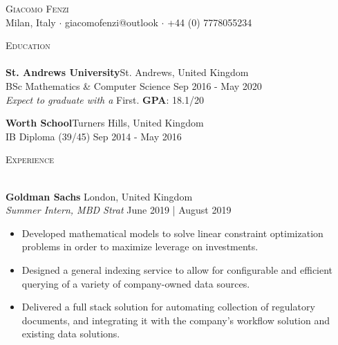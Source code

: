 \documentclass[a4paper]{article}
\newcommand{\lineunder} {
    \vspace*{-8pt} \\
    \hspace*{-18pt} \hrulefill \\
}
\newcommand{\header} [1] {
    {\hspace*{-18pt}\vspace*{6pt} \textsc{#1}}
    \vspace*{-6pt} \lineunder
}
\begin{document}
\vspace*{-40pt}

    

\vspace*{-10pt}
\begin{center}
	{\Huge \scshape {Giacomo Fenzi}}\\
	Milan, Italy $\cdot$ giacomofenzi@outlook $\cdot$ +44 (0) 7778055234\\
\end{center}

\header{Education}
\textbf{St. Andrews University}\hfill St. Andrews, United Kingdom\\
BSc Mathematics \& Computer Science \hfill Sep 2016 - May 2020\\
\textit{Expect to graduate with a} First. \textbf{GPA}: 18.1/20 \\
\vspace{2mm}

\textbf{Worth School}\hfill Turners Hills, United Kingdom\\
IB Diploma (39/45) \hfill Sep 2014 - May 2016 \\

\vspace{2mm}

\header{Experience}
\vspace{1mm}

\textbf{Goldman Sachs} \hfill London, United Kingdom \\
\textit{Summer Intern, MBD Strat} \hfill{June 2019 | August 2019}
\vspace{-1mm}
\begin{itemize} \itemsep 1pt
    \item Developed mathematical models to solve linear constraint optimization problems in order to maximize leverage on investments.
    \item Designed a general indexing service to allow for configurable and efficient querying of a variety of company-owned data sources. 
    \item Delivered a full stack solution for automating collection of regulatory documents, and integrating it with the company's workflow solution and existing data solutions.  
\end{itemize}
\end{document}
